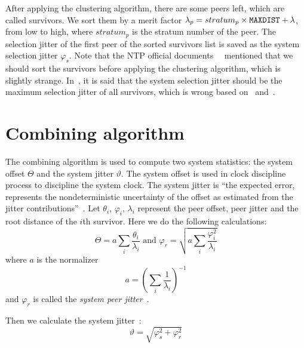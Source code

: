 After applying the clustering algorithm, there are some peers left, which are
called survivors. We sort them by a merit factor $\lambda_p = stratum_p \times
\verb|MAXDIST| + \lambda$, from low to high, where $stratum_p$ is the stratum
number of the peer. The selection jitter of the first peer of the sorted
survivors list is saved as the system selection jitter $\varphi_s$. Note that
the NTP official documents~\cite{redbook}~\cite{rfc5905} mentioned that we
should sort the survivors before applying the clustering algorithm, which is
slightly strange. In~\cite{rfc5905}, it is said that the system selection
jitter should be the maximum selection jitter of all survivors, which is wrong
based on~\cite{redbook} and~\cite{source_code}.

\section{Combining algorithm}%
\label{sec:combine_algorithm}
The combining algorithm is used to compute two system statistics: the system
offset $\Theta$ and the system jitter $\vartheta$. The system offset is used
in clock discipline process to discipline the system clock. The system jitter
is ``the expected error, represents the nondeterministic uncertainty of the
offset as estimated from the jitter contributions''~\cite{redbook}.
Let $\theta_i$, $\varphi_i$,
$\lambda_i$ represent the peer offset, peer jitter and the root distance of the
$i$th survivor. Here we do the following calculations:~\cite{redbook}
\begin{equation}
    \Theta = a \sum^{}_{i} \frac{\theta_i}{\lambda_i} \text{ and } 
    \varphi_r = \sqrt{a \sum^{}_{i} \frac{\varphi_i ^ 2}{\lambda_i}}
    \label{eq:system_offset_selection_jitter}
\end{equation}
where $a$ is the normalizer
\begin{equation}
    a = \left( \sum^{}_{i} \frac{1}{\lambda_i} \right) ^ {-1}
    \label{eq:normalizer}
\end{equation}
and $\varphi_r$ is called the \emph{system peer jitter}~\cite{rfc5905}.

Then we calculate the system jitter~\cite{redbook}:
\begin{equation}
    \vartheta = \sqrt{\varphi_s^2 + \varphi_r^2}
    \label{eq:system_jitter}
\end{equation}

